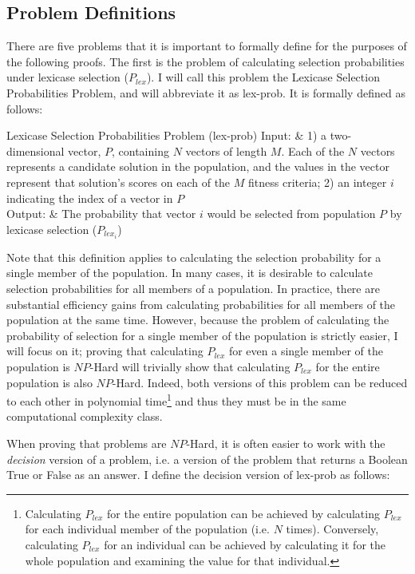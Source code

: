 \documentclass[sigconf]{acmart}
\begin{document}
\subsection{Problem Definitions}

There are five problems that it is important to formally define for the purposes of the following proofs. The first is the problem of calculating selection probabilities under lexicase selection ($P_{lex}$). I will call this problem the {\sc Lexicase Selection Probabilities Problem}, and will abbreviate it as {\sc lex-prob}. It is formally defined as follows:

\begin{problem}[ruled]{Lexicase Selection Probabilities Problem (lex-prob)}
  Input: & 1) a two-dimensional vector, $P$, containing $N$ vectors of length $M$. Each of the $N$ vectors represents a candidate solution in the population, and the values in the vector represent that solution's scores on each of the $M$ fitness criteria; 2) an integer $i$ indicating the index of a vector in $P$ \\
  Output: & The probability that vector $i$ would be selected from population $P$ by lexicase selection ($P_{lex_i}$)\\
\end{problem}

Note that this definition applies to calculating the selection probability for a single member of the population. In many cases, it is desirable to calculate selection probabilities for all members of a population. In practice, there are substantial efficiency gains from calculating probabilities for all members of the population at the same time. However, because the problem of calculating the probability of selection for a single member of the population is strictly easier, I will focus on it; proving that calculating $P_{lex}$ for even a single member of the population is $NP$-Hard will trivially show that calculating $P_{lex}$ for the entire population is also $NP$-Hard. Indeed, both versions of this problem can be reduced to each other in polynomial time\footnote{Calculating $P_{lex}$ for the entire population can be achieved by calculating $P_{lex}$ for each individual member of the population (i.e. $N$ times). Conversely, calculating $P_{lex}$ for an individual can be achieved by calculating it for the whole population and examining the value for that individual.} and thus they must be in the same computational complexity class. 

When proving that problems are $NP$-Hard, it is often easier to work with the \textit{decision} version of a problem, i.e. a version of the problem that returns a Boolean True or False as an answer. I define the decision version of {\sc lex-prob} as follows: 
\end{document}
